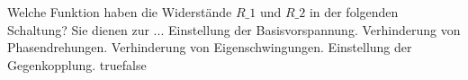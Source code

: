     {Welche Funktion haben die Widerstände $R\_1$ und $R\_2$ in der folgenden Schaltung? Sie dienen zur ...}
    {Einstellung der Basisvorspannung.}
    {Verhinderung von Phasendrehungen.}
    {Verhinderung von Eigenschwingungen.}
    {Einstellung der Gegenkopplung.}
    {true}{false}